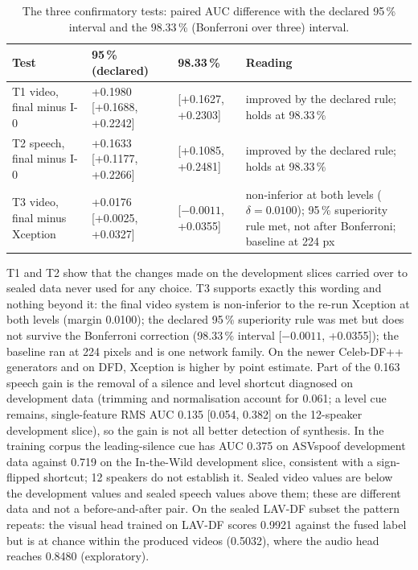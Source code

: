 \documentclass[conference,a4paper]{IEEEtran_nodash}
\begin{document}
\begin{table}[!t]
\centering
\caption[Confirmatory tests]{The three confirmatory tests: paired AUC difference
with the declared 95\,\% interval and the 98.33\,\% (Bonferroni over three)
interval.}
\label{tab:tests}
\scriptsize
\setlength{\tabcolsep}{2pt}
\begin{tabular}{@{}L{1.45cm} L{2.2cm} L{1.7cm} L{2.65cm}@{}}
\toprule
Test & 95\,\% (declared) & 98.33\,\% & Reading \\
\midrule
T1 video, final minus I-0 & +0.1980 [+0.1688, +0.2242] & [+0.1627, +0.2303] & improved by the declared rule; holds at 98.33\,\% \\
T2 speech, final minus I-0 & +0.1633 [+0.1177, +0.2266] & [+0.1085, +0.2481] & improved by the declared rule; holds at 98.33\,\% \\
T3 video, final minus Xception & +0.0176 [+0.0025, +0.0327] & [$-0.0011$, +0.0355] & non-inferior at both levels ($\delta=0.0100$); 95\,\% superiority rule met, not after Bonferroni; baseline at 224 px \\
\bottomrule
\end{tabular}
\end{table}

T1 and T2 show that the changes made on the development slices carried over to
sealed data never used for any choice. T3 supports exactly this wording and
nothing beyond it: the final video system is non-inferior to the re-run Xception
at both levels (margin 0.0100); the declared 95\,\% superiority rule was met
but does not survive the Bonferroni correction (98.33\,\% interval [$-0.0011$,
+0.0355]); the baseline ran at 224 pixels and is one network family. On the newer
Celeb-DF++ generators and on DFD, Xception is higher by point estimate. Part of the
0.163 speech gain is the removal of a silence and level shortcut diagnosed on
development data (trimming and normalisation account for 0.061; a level cue
remains, single-feature RMS AUC 0.135 [0.054, 0.382] on the 12-speaker development
slice), so the gain is not all better detection of synthesis. In the training
corpus the leading-silence cue has AUC 0.375 on ASVspoof development data against
0.719 on the In-the-Wild development slice, consistent with a sign-flipped
shortcut; 12 speakers do not establish it. Sealed video values are below the
development values and sealed speech values above them; these are different data
and not a before-and-after pair. On the sealed LAV-DF subset the pattern repeats:
the visual head trained on LAV-DF scores 0.9921 against the fused label but is at
chance within the produced videos (0.5032), where the audio head reaches 0.8480
(exploratory). %
\end{document}

